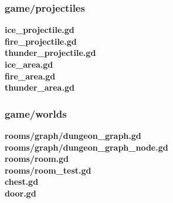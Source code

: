\documentclass{article}
\begin{document}
\subsubsection{game/projectiles}
\textbf{ice\_projectile.gd}\\

\textbf{fire\_projectile.gd}\\

\textbf{thunder\_projectile.gd}\\

\textbf{ice\_area.gd}\\

\textbf{fire\_area.gd}\\

\textbf{thunder\_area.gd}\\

\subsubsection{game/worlds}
\textbf{rooms/graph/dungeon\_graph.gd}\\

\textbf{rooms/graph/dungeon\_graph\_node.gd}\\

\textbf{rooms/room.gd}\\

\textbf{rooms/room\_test.gd}\\

\textbf{chest.gd}\\

\textbf{door.gd}\\

\end{document}
